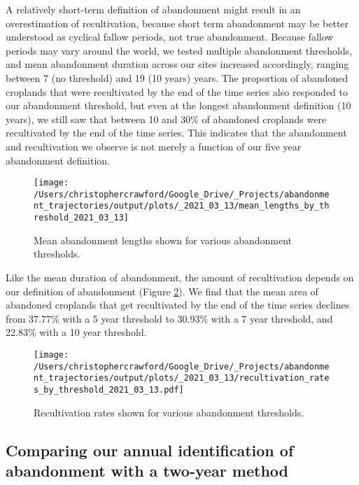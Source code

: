 \documentclass[9pt,twoside,lineno]{pnas-new}
\begin{document}
A relatively short-term definition of abandonment might result in an overestimation of recultivation, because short term abandonment may be better understood as cyclical fallow periods, not true abandonment.
Because fallow periods may vary around the world, we tested multiple abandonment thresholds, and mean abandonment duration across our sites increased accordingly, ranging between 7 (no threshold) and 19 (10 years) years.
The proportion of abandoned croplands that were recultivated by the end of the time series also responded to our abandonment threshold, but even at the longest abandonment definition (10 years), we still saw that between 10 and 30\% of abandoned croplands were recultivated by the end of the time series.
This indicates that the abandonment and recultivation we observe is not merely a function of our five year abandonment definition.



\begin{figure}
\texttt{[image: /Users/christophercrawford/Google\_Drive/\_Projects/abandonment\_trajectories/output/plots/\_2021\_03\_13/mean\_lengths\_by\_threshold\_2021\_03\_13]} \caption{Mean abandonment lengths shown for various abandonment thresholds.}\label{fig:abn-thresholds-mean-duration}
\end{figure}

Like the mean duration of abandonment, the amount of recultivation depends on our definition of abandonment (Figure \ref{fig:recult-by-threshold}). We find that the mean area of abandoned croplands that get recultivated by the end of the time series declines from 37.77\% with a 5 year threshold to 30.93\% with a 7 year threshold, and 22.83\% with a 10 year threshold.



\begin{figure}
\centering
\texttt{[image: /Users/christophercrawford/Google\_Drive/\_Projects/abandonment\_trajectories/output/plots/\_2021\_03\_13/recultivation\_rates\_by\_threshold\_2021\_03\_13.pdf]}
\caption{\label{fig:recult-by-threshold}Recultivation rates shown for various abandonment thresholds.}
\end{figure}

\hypertarget{twoyr-vs-annual}{%
\subsection{Comparing our annual identification of abandonment with a two-year method}\label{twoyr-vs-annual}}
\end{document}
